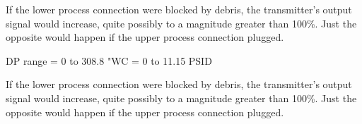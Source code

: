 





If the lower process connection were blocked by debris, the transmitter's output signal would increase, quite possibly to a magnitude greater than 100\%.  Just the opposite would happen if the upper process connection plugged.







DP range = 0 to 308.8 "WC = 0 to 11.15 PSID

\vskip 10pt

If the lower process connection were blocked by debris, the transmitter's output signal would increase, quite possibly to a magnitude greater than 100\%.  Just the opposite would happen if the upper process connection plugged.




